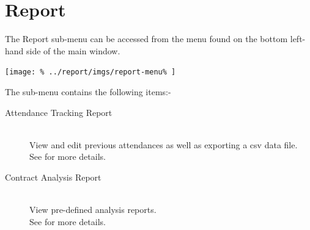 \documentclass[../main/main]{subfiles}
\begin{document}
\newpage
\chapter{Report}
The Report sub-menu can be accessed from the menu found on the bottom
left-hand side of the main window.

\texttt{[image: \%
  ../report/imgs/report-menu\%
]}

The sub-menu contains the following items:-
\begin{description}
\item[Attendance Tracking Report] \hfill \\
View and edit previous attendances as well as exporting a csv data file.\\
See  for more details.
\item[Contract Analysis Report] \hfill \\
View pre-defined analysis reports.\\
See  for more details.
\end{description}



\end{document}

